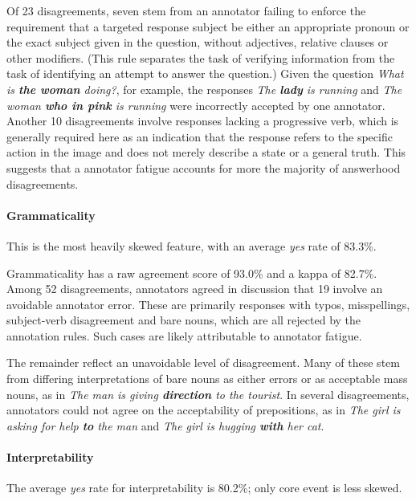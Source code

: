 \documentclass[11pt,a4paper]{article}
\begin{document}
Of 23 disagreements, seven stem from an annotator failing to enforce the requirement that a targeted response subject be either an appropriate pronoun or the exact subject given in the question, without adjectives, relative clauses or other modifiers. (This rule separates the task of verifying information from the task of identifying an attempt to answer the question.) Given the question \textit{What is \textbf{the woman} doing?}, for example, the responses \textit{The \textbf{lady} is running} and \textit{The woman \textbf{who in pink} is running} were incorrectly accepted by one annotator. Another 10 disagreements involve responses lacking a progressive verb, which is generally required here as an indication that the response refers to the specific action in the image and does not merely describe a state or a general truth. This suggests that a annotator fatigue accounts for more the majority of answerhood disagreements.

\paragraph{Grammaticality} This is the most heavily skewed feature, with an average \textit{yes} rate of 83.3\%.

Grammaticality has a raw agreement score of 93.0\% and a kappa of 82.7\%. Among 52 disagreements, annotators agreed in discussion that 19 involve an avoidable annotator error. These are primarily responses with typos, misspellings, subject-verb disagreement and bare nouns, which are all rejected by the annotation rules. Such cases are likely attributable to annotator fatigue.

The remainder reflect an unavoidable level of disagreement. Many of these stem from differing interpretations of bare nouns as either errors or as acceptable mass nouns, as in \textit{The man is giving \textbf{direction} to the tourist}. In several disagreements, annotators could not agree on the acceptability of prepositions, as in \textit{The girl is asking for help \textbf{to} the man} and \textit{The girl is hugging \textbf{with} her cat}.


\paragraph{Interpretability} The average \textit{yes} rate for interpretability is 80.2\%; only core event is less skewed.
\end{document}
